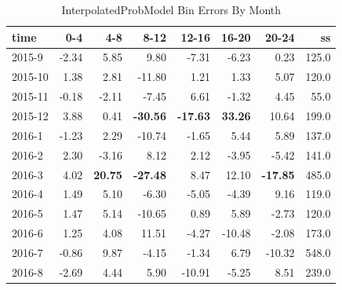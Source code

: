 \documentclass[oneside]{article}
\begin{document}
\begin{table}[]
  \caption{InterpolatedProbModel Bin Errors By Month}
  \centering
  \label{tab:interpolated_bin_errors_over_months}
  \begin{tabular}{lrrrrrrr}
    \toprule
    \textbf{time} & \textbf{0-4}& \textbf{4-8}& \textbf{8-12}& \textbf{12-16}& \textbf{16-20}& \textbf{20-24}&  \textbf{ss} \\
    \midrule
    \hline
    2015-9  &  -2.34 &   5.85 &   9.80 &  -7.31 &  -6.23 &   0.23 &        125.0 \\
    2015-10 &   1.38 &   2.81 & -11.80 &   1.21 &   1.33 &   5.07 &        120.0 \\
    2015-11 &  -0.18 &  -2.11 &  -7.45 &   6.61 &  -1.32 &   4.45 &         55.0 \\
    2015-12 &   3.88 &   0.41 & \textbf{-30.56} & \textbf{-17.63} &  \textbf{33.26} &  10.64 &        199.0 \\
    2016-1  &  -1.23 &   2.29 & -10.74 &  -1.65 &   5.44 &   5.89 &        137.0 \\
    2016-2  &   2.30 &  -3.16 &   8.12 &   2.12 &  -3.95 &  -5.42 &        141.0 \\
    2016-3  &   4.02 &  \textbf {20.75 } & \textbf{-27.48 } &   8.47 &  12.10 & \textbf{-17.85} &        485.0 \\
    2016-4  &   1.49 &   5.10 &  -6.30 &  -5.05 &  -4.39 &   9.16 &        119.0 \\
    2016-5  &   1.47 &   5.14 & -10.65 &   0.89 &   5.89 &  -2.73 &        120.0 \\
    2016-6  &   1.25 &   4.08 &  11.51 &  -4.27 & -10.48 &  -2.08 &        173.0 \\
    2016-7  &  -0.86 &   9.87 &  -4.15 &  -1.34 &   6.79 & -10.32 &        548.0 \\
    2016-8  &  -2.69 &   4.44 &   5.90 & -10.91 &  -5.25 &   8.51 &        239.0 \\
    \hline
    \bottomrule
  \end{tabular}
\end{table}
\end{document}
